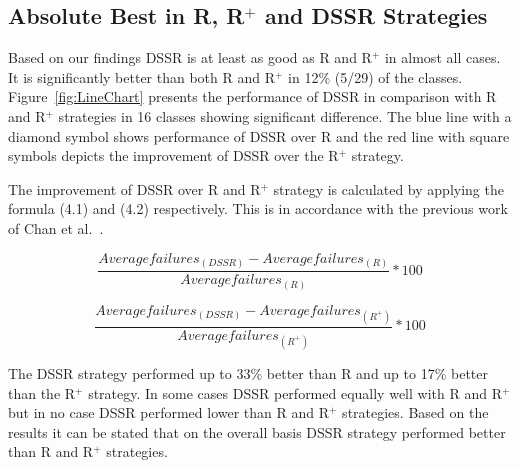 \subsection{Absolute Best in R, R$^+$ and DSSR Strategies}
Based on our findings DSSR is at least as good as R and R$^+$ in almost all cases. It is significantly better than both R and R$^+$ in 12\% (5/29) of the classes. Figure~\ref{fig:LineChart} presents the performance of DSSR in comparison with R and R$^+$ strategies in 16 classes showing significant difference. The blue line with a diamond symbol shows performance of DSSR over R and the red line with square symbols depicts the improvement of DSSR over the R$^+$ strategy. 

The improvement of DSSR over R and R$^+$ strategy is calculated by applying the formula (4.1) and (4.2) respectively. This is in accordance with the previous work of Chan et al.~\cite{chan2004good}.

\begin{equation} \frac{Averagefailures_{(DSSR)} - Averagefailures_{(R)}}{Averagefailures_{(R)}} * 100  \end{equation}

\begin{equation} \frac{Averagefailures_{(DSSR)} - Averagefailures_{(R^+)}}{Averagefailures_{(R^+)}}  * 100 \end{equation}

The DSSR strategy performed up to 33\% better than R and up to 17\% better than the R$^+$ strategy. In some cases DSSR performed equally well with R and R$^+$ but in no case DSSR performed lower than R and R$^+$ strategies. Based on the results it can be stated that on the overall basis DSSR strategy performed better than R and R$^+$ strategies. 

